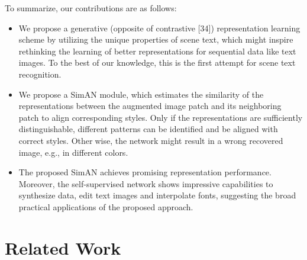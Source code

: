 \documentclass{article}
\begin{document}
\begin{multicols}{2}
To summarize, our contributions are as follows:

\begin{itemize}
    \item We propose a generative (opposite of contrastive [34])
representation learning scheme by utilizing the unique
properties of scene text, which might inspire rethinking the learning of better representations for sequential
data like text images. To the best of our knowledge,
this is the first attempt for scene text recognition.

   \item  We propose a SimAN module, which estimates the
similarity of the representations between the augmented image patch and its neighboring patch to align
corresponding styles. Only if the representations are
sufficiently distinguishable, different patterns can be
identified and be aligned with correct styles. Otherwise, the network might result in a wrong recovered
image, e.g., in different colors.

\item  The proposed SimAN achieves promising representation performance. Moreover, the self-supervised network shows impressive capabilities to synthesize data,
edit text images and interpolate fonts, suggesting the
broad practical applications of the proposed approach.

\end{itemize}

\section{Related Work}

\end{multicols}
\end{document}
